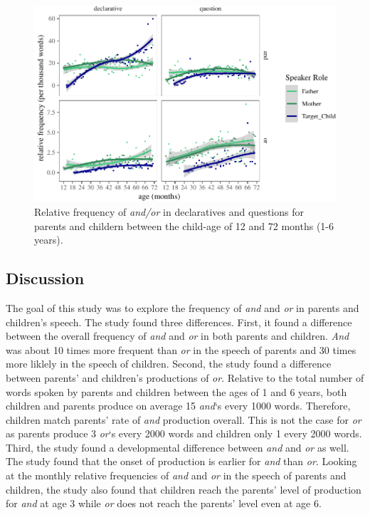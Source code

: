 \documentclass[oneside]{report}
\theoremstyle{definition}
\theoremstyle{definition}
\theoremstyle{definition}
\theoremstyle{remark}
\begin{document}
\begin{figure}[tb]

{\centering \includegraphics{figs/ageSpeechActPlot-1} 

}

\caption{Relative frequency of \textit{and/or} in declaratives and questions for parents and childern between the child-age of 12 and 72 months (1-6 years).}\label{fig:ageSpeechActPlot}
\end{figure}
\subsection{Discussion}\label{study1discussion}

The goal of this study was to explore the frequency of \emph{and} and
\emph{or} in parents and children's speech. The study found three
differences. First, it found a difference between the overall frequency
of \emph{and} and \emph{or} in both parents and children. \emph{And} was
about 10 times more frequent than \emph{or} in the speech of parents and
30 times more liklely in the speech of children. Second, the study found
a difference between parents' and children's productions of \emph{or}.
Relative to the total number of words spoken by parents and children
between the ages of 1 and 6 years, both children and parents produce on
average 15 \emph{and}`s every 1000 words. Therefore, children match
parents' rate of \emph{and} production overall. This is not the case for
\emph{or} as parents produce 3 \emph{or}`s every 2000 words and children
only 1 every 2000 words. Third, the study found a developmental
difference between \emph{and} and \emph{or} as well. The study found
that the onset of production is earlier for \emph{and} than \emph{or}.
Looking at the monthly relative frequencies of \emph{and} and \emph{or}
in the speech of parents and children, the study also found that
children reach the parents' level of production for \emph{and} at age 3
while \emph{or} does not reach the parents' level even at age 6.
\end{document}
